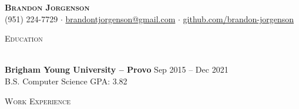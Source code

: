 \documentclass[letterpaper]{article}
\newcommand{\lineunder} {
    \vspace*{-8pt} \\
    \hspace*{-18pt} \hrulefill \\
}
\newcommand{\header} [1] {
    {\hspace*{-18pt}\vspace*{6pt} \textsc{#1}}
    \vspace*{-6pt} \lineunder
    \vspace{1mm}
}
\begin{document}
\vspace*{-40pt}

\vspace*{-10pt}
\begin{center}
    {\Huge \scshape \textbf {Brandon Jorgenson}}\\
    \vspace{1mm}
    (951) 224-7729 $\cdot$ \href{mailto:brandontjorgenson@gmail.com}{brandontjorgenson@gmail.com} $\cdot$ \href{https://github.com/brandon-jorgenson}{github.com/brandon-jorgenson}\\
\end{center}

\header{Education}
\textbf{Brigham Young University -- Provo} \hfill Sep 2015 -- Dec 2021\\
\vspace{.5mm}
B.S. Computer Science  \hfill GPA: 3.82\\
\vspace{2mm}

\header{Work Experience}
\end{document}
